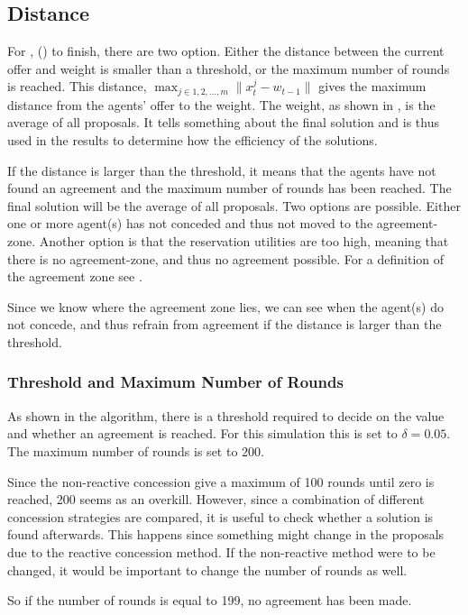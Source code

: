 \subsection{Distance}
For , () to finish, there are two option. Either the distance between the current offer and weight is smaller than a threshold, or the maximum number of rounds is reached. This distance, $ \displaystyle\max_{ j \in {1,2,...,m}} \parallel x^j_t-w_{t-1} \parallel$ gives the maximum distance from the agents' offer to the weight. The weight, as shown in , is the average of all proposals. It tells something about the final solution and is thus used in the results to determine how the efficiency of the solutions. 

If the distance is larger than the threshold, it means that the agents have not found an agreement and the maximum number of rounds has been reached. The final solution will be the average of all proposals. Two options are possible. Either one or more agent(s) has not conceded and thus not moved to the agreement-zone. Another option is that the reservation utilities are too high, meaning that there is no agreement-zone, and thus no agreement possible. For a definition of the agreement zone see .

Since we know where the agreement zone lies, we can see when the agent(s) do not concede, and thus refrain from agreement if the distance is larger than the threshold.

\subsubsection{Threshold and Maximum Number of Rounds}
As shown in the algorithm, there is a threshold required to decide on the value and whether an agreement is reached. For this simulation this is set to $\delta = 0.05$.	The maximum number of rounds is set to $200$.

Since the non-reactive concession give a maximum of 100 rounds until zero is reached, 200 seems as an overkill. However, since a combination of different concession strategies are compared, it is useful to check whether a solution is found afterwards. This happens since something might change in the proposals due to the reactive concession method. If the non-reactive method were to be changed, it would be important to change the number of rounds as well. 

So if the number of rounds is equal to 199, no agreement has been made.

